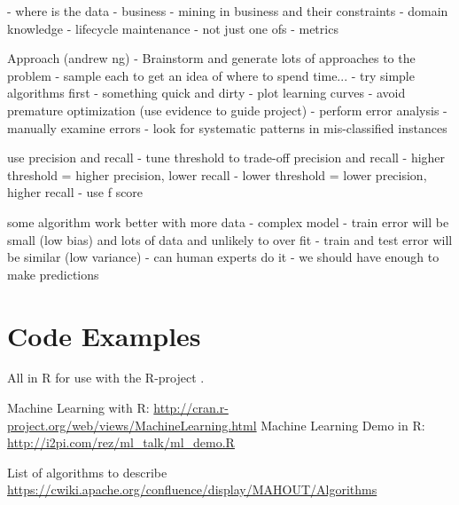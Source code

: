 \begin{bibunit}
- where is the data - business
- mining in business and their constraints
- domain knowledge
- lifecycle maintenance - not just one ofs
- metrics

Approach (andrew ng)
- Brainstorm and generate lots of approaches to the problem - sample each to get an idea of where to spend time...
- try simple algorithms first - something quick and dirty
- plot learning curves
	- avoid premature optimization (use evidence to guide project)
- perform error analysis
	- manually examine errors
	- look for systematic patterns in mis-classified instances

use precision and recall
- tune threshold to trade-off precision and recall
	- higher threshold = higher precision, lower recall
	- lower threshold = lower precision, higher recall
- use f score

some algorithm work better with more data
- complex model - train error will be small (low bias) and lots of data and unlikely to over fit - train and test error will be similar (low variance)
- can human experts do it - we should have enough to make predictions


\section{Code Examples}

All in R for use with the R-project \cite{RDevelopmentCoreTeam2011}.

Machine Learning with R: \url{http://cran.r-project.org/web/views/MachineLearning.html}
Machine Learning Demo in R: \url{http://i2pi.com/rez/ml_talk/ml_demo.R}

List of algorithms to describe \url{https://cwiki.apache.org/confluence/display/MAHOUT/Algorithms}


\renewcommand{\bibsection}{\section{\bibname}}
\putbib
\end{bibunit}
